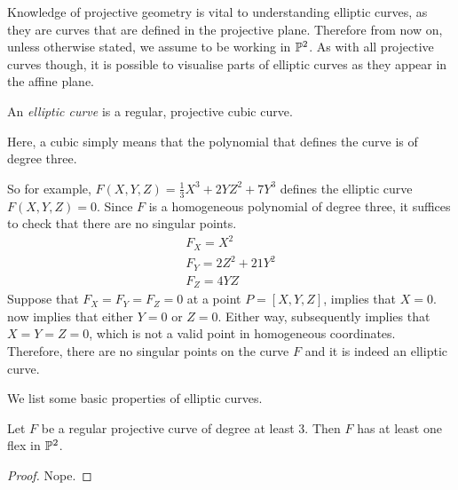 Knowledge of projective geometry is vital to understanding elliptic curves, as they are curves that are defined in the projective plane.
Therefore from now on, unless otherwise stated, we assume to be working in $\pn[2]$.
As with all projective curves though, it is possible to visualise parts of elliptic curves as they appear in the affine plane.
\begin{definition}
	An \emph{elliptic curve} is a regular, projective cubic curve.
\end{definition}
Here, a cubic simply means that the polynomial that defines the curve is of degree three.

So for example, $F(X,Y,Z) = \frac{1}{3}X^3 + 2YZ^2 + 7Y^3$ defines the elliptic curve $F(X,Y,Z) = 0$.
Since $F$ is a homogeneous polynomial of degree three, it suffices to check that there are no singular points.
\begin{align}
	F_X = X^2 \label{deriv-1}\\
	F_Y = 2Z^2 + 21Y^2 \label{deriv-2}\\
	F_Z = 4YZ \label{deriv-3}
\end{align}
Suppose that $F_X = F_Y = F_Z = 0$ at a point $P = [X,Y,Z]$,  implies that $X=0$.
 now implies that either $Y=0$ or $Z=0$.
Either way,  subsequently implies that $X = Y = Z = 0$, which is not a valid point in homogeneous coordinates.
Therefore, there are no singular points on the curve $F$ and it is indeed an elliptic curve.

We list some basic properties of elliptic curves.
\begin{theorem}
	Let $F$ be a regular projective curve of degree at least 3. Then $F$ has at least one flex in $\pn[2]$.
\end{theorem}
\begin{proof}
	Nope. %
\end{proof}

